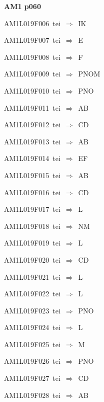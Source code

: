 \par\vfill\eject
{\bf\hfill AM1 p060\hfill\hbox{}}\par\bigskip
{\sixrm AM1L019F006\ {\sixit tei}\ }$\Rightarrow$\ IK\par\smallskip
{\sixrm AM1L019F007\ {\sixit tei}\ }$\Rightarrow$\ E\par\smallskip
{\sixrm AM1L019F008\ {\sixit tei}\ }$\Rightarrow$\ F\par\smallskip
{\sixrm AM1L019F009\ {\sixit tei}\ }$\Rightarrow$\ PNOM\par\smallskip
{\sixrm AM1L019F010\ {\sixit tei}\ }$\Rightarrow$\ PNO\par\smallskip
{\sixrm AM1L019F011\ {\sixit tei}\ }$\Rightarrow$\ AB\par\smallskip
{\sixrm AM1L019F012\ {\sixit tei}\ }$\Rightarrow$\ CD\par\smallskip
{\sixrm AM1L019F013\ {\sixit tei}\ }$\Rightarrow$\ AB\par\smallskip
{\sixrm AM1L019F014\ {\sixit tei}\ }$\Rightarrow$\ EF\par\smallskip
{\sixrm AM1L019F015\ {\sixit tei}\ }$\Rightarrow$\ AB\par\smallskip
{\sixrm AM1L019F016\ {\sixit tei}\ }$\Rightarrow$\ CD\par\smallskip
{\sixrm AM1L019F017\ {\sixit tei}\ }$\Rightarrow$\ L\par\smallskip
{\sixrm AM1L019F018\ {\sixit tei}\ }$\Rightarrow$\ NM\par\smallskip
{\sixrm AM1L019F019\ {\sixit tei}\ }$\Rightarrow$\ L\par\smallskip
{\sixrm AM1L019F020\ {\sixit tei}\ }$\Rightarrow$\ CD\par\smallskip
{\sixrm AM1L019F021\ {\sixit tei}\ }$\Rightarrow$\ L\par\smallskip
{\sixrm AM1L019F022\ {\sixit tei}\ }$\Rightarrow$\ L\par\smallskip
{\sixrm AM1L019F023\ {\sixit tei}\ }$\Rightarrow$\ PNO\par\smallskip
{\sixrm AM1L019F024\ {\sixit tei}\ }$\Rightarrow$\ L\par\smallskip
{\sixrm AM1L019F025\ {\sixit tei}\ }$\Rightarrow$\ M\par\smallskip
{\sixrm AM1L019F026\ {\sixit tei}\ }$\Rightarrow$\ PNO\par\smallskip
{\sixrm AM1L019F027\ {\sixit tei}\ }$\Rightarrow$\ CD\par\smallskip
{\sixrm AM1L019F028\ {\sixit tei}\ }$\Rightarrow$\ AB\par\smallskip
